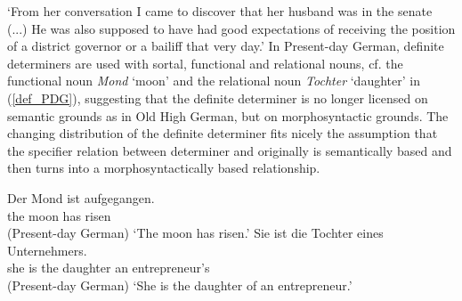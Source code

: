 \documentclass[output=paper
                ,modfonts
                ,nonflat
	        ,collection
	        ,collectionchapter
	        ,collectiontoclongg
 	        ,biblatex
                ,babelshorthands
                ,newtxmath
                ,draftmode
                ,colorlinks, citecolor=brown
]{./langsci/langscibook}
\begin{document}
\glt `From her conversation I came to discover that her husband was in the senate (...) He was also supposed to have had good expectations of receiving the position of a district governor or a bailiff that very day.'
\zl
In Present-day German, definite determiners are used with sortal, functional and relational nouns, cf. the functional noun \textit{Mond} `moon' and the relational noun \textit{Tochter} `daughter' in (\ref{def_PDG}), suggesting that the definite determiner is no longer licensed on semantic grounds as in Old High German, but on morphosyntactic grounds. The changing distribution of the definite determiner fits nicely the assumption that the specifier relation between determiner and \nom {} originally is semantically based and then turns into a morphosyntactically based relationship.

\eal \label{def_PDG}
\ex 
\gll Der Mond ist aufgegangen. \\ the moon has risen \\ \hfill (Present-day German)
\glt `The moon has risen.'
\ex 
\gll Sie ist die Tochter eines Unternehmers. \\  she is the daughter an entrepreneur's    \\ \hfill (Present-day German)
\glt `She is the daughter of an entrepreneur.'  
\zl
\end{document}
